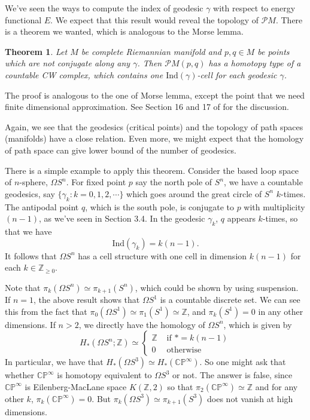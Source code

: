 \documentclass{article}
\newtheorem{theorem}{Theorem}[section]
\newcommand{\Z}{\mathbb{Z}}
\newcommand{\CP}{\mathbb{CP}}
\newcommand{\Om}{\Omega}
\newcommand{\PM}{\mathcal{P}M}
\newcommand{\g}{\gamma}
\newcommand{\Ind}{\mathrm{Ind}}
\begin{document}
We've seen the ways to compute the index of geodesic $\g$ with respect to energy functional $E$.
We expect that this result would reveal the topology of $\PM$.
There is a theorem we wanted, which is analogous to the Morse lemma.
	\begin{theorem}\rm
	Let $M$ be complete Riemannian manifold and $p,q\in M$ be points which are not conjugate along any $\g$.
	Then $\PM(p,q)$ has a homotopy type of a countable CW complex, which contains one $\Ind(\g)$-cell for each geodesic $\g$.
	\end{theorem}
The proof is analogous to the one of Morse lemma, except the point that we need finite dimensional approximation.
See Section 16 and 17 of \cite{m1} for the discussion.

Again, we see that the geodesics (critical points) and the topology of path spaces (manifolds) have a close relation.
Even more, we might expect that the homology of path space can give lower bound of the number of geodesics.

There is a simple example to apply this theorem.
Consider the based loop space of $n$-sphere, $\Om S^n$.
For fixed point $p$ say the north pole of $S^n$, we have a countable geodesics, say $\{\g_k:k=0,1,2,\cdots\}$ which goes around the great circle of $S^n$ $k$-times.
The antipodal point $q$, which is the south pole, is conjugate to $p$ with multiplicity $(n-1)$, as we've seen in Section 3.4.
In the geodesic $\g_k$, $q$ appears $k$-times, so that we have
	$$\Ind(\g_k)=k(n-1).$$
It follows that $\Om S^n$ has a cell structure with one cell in dimension $k(n-1)$ for each $k\in\Z_{\geq0}$.

Note that $\pi_k(\Om S^n)\simeq\pi_{k+1}(S^n)$, which could be shown by using suspension.
If $n=1$, the above result shows that $\Om S^1$ is a countable discrete set.
We can see this from the fact that $\pi_0(\Om S^1)\simeq\pi_1(S^1)\simeq\Z$, and $\pi_k(S^1)=0$ in any other dimensions. 
If $n>2$, we directly have the homology of $\Om S^n$, which is given by
	$$H_*(\Om S^n;\Z)\simeq\left\{\begin{array}{cc}
			\Z&\text{ if }*=k(n-1)\\
			0&\text{ otherwise}
			\end{array}\right.$$
In particular, we have that $H_*(\Om S^3)\simeq H_*(\CP^\infty)$.
So one might ask that whether $\CP^\infty$ is homotopy equivalent to $\Om S^3$ or not.
The answer is false, since $\CP^\infty$ is Eilenberg-MacLane space $K(\Z,2)$ so that $\pi_2(\CP^\infty)\simeq\Z$ and for any other $k$, $\pi_k(\CP^\infty)=0$.
But $\pi_k(\Om S^3)\simeq\pi_{k+1}(S^3)$ does not vanish at high dimensions.
\end{document}
